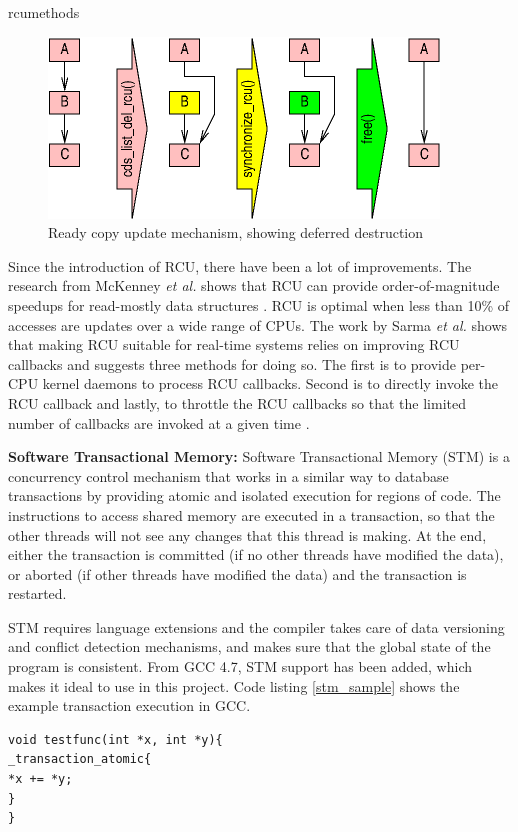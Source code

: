 \begin{labeling}{rcumethods}
\begin{figure}[h]
\centering
\includegraphics[width=0.7\linewidth]{figures/rcu}
\caption{Ready copy update mechanism, showing deferred destruction \cite{whatisrcu}}
\label{fig:rcu}
\end{figure}
\end{labeling}

Since the introduction of RCU, there have been a lot of improvements. The research from McKenney \emph{et al.} shows that RCU can provide order-of-magnitude speedups for read-mostly data structures \cite{whatisrcu}. RCU is optimal when less than 10\% of accesses are updates over a wide range of CPUs. The work by Sarma \emph{et al.} shows that making RCU suitable for real-time systems relies on improving RCU callbacks and suggests three methods for doing so. The first is to provide per-CPU kernel daemons to process RCU callbacks. Second is to directly invoke the RCU callback and lastly, to throttle the RCU callbacks so that the limited number of callbacks are invoked at a given time \cite{sarma2004making}.

\textbf{Software Transactional Memory:}
Software Transactional Memory (STM) is a concurrency control mechanism that works in a similar way to database transactions by providing atomic and isolated execution for regions of code. The instructions to access shared memory are executed in a transaction, so that the other threads will not see any changes that this thread is making. At the end, either the transaction is committed (if no other threads have modified the data), or aborted (if other threads have modified the data) and the transaction is restarted. 

STM requires language extensions and the compiler takes care of data versioning and conflict detection mechanisms, and makes sure that the global state of the program is consistent. From GCC 4.7, STM support has been added, which makes it ideal to use in this project. Code listing \ref{stm_sample} shows the example transaction execution in GCC.


\begin{lstlisting}[caption={STM example code in GCC},label={stm_sample}, style=customcpp]
void testfunc(int *x, int *y){
_transaction_atomic{
*x += *y;
}
}
\end{lstlisting}

